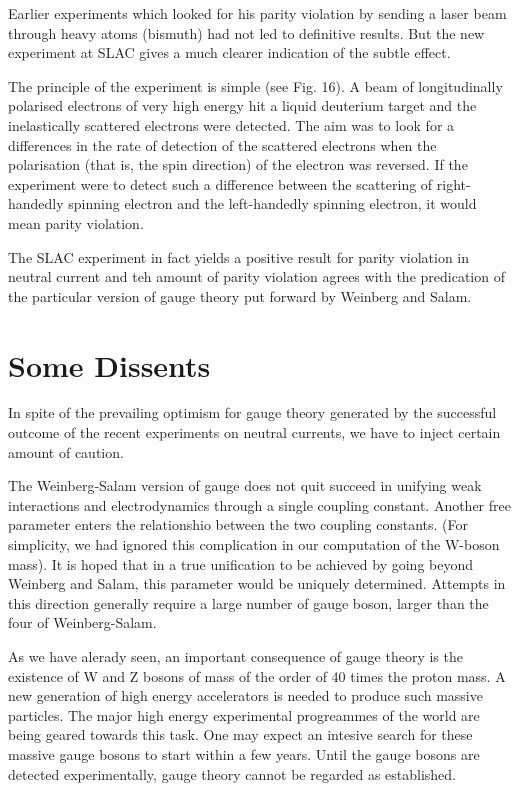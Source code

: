 Earlier experiments which looked for his parity violation by sending a laser beam through heavy atoms (bismuth) had not led to definitive results. But the new experiment at SLAC gives a much clearer indication of the subtle effect.

The principle of the experiment is simple (see Fig. 16). A beam of longitudinally polarised electrons of very high energy hit a liquid deuterium target and the inelastically scattered electrons were detected. The aim was to look for a differences in the rate of detection of the scattered electrons when the polarisation (that is, the spin direction) of the electron was reversed. If the experiment were to detect such a difference between the scattering of right-handedly spinning electron and the left-handedly spinning electron, it would mean parity violation.

The SLAC experiment in fact yields a positive result for parity violation in neutral current and teh amount of parity violation agrees with the predication of the particular version of gauge theory put forward by Weinberg and Salam.

\section*{Some Dissents}

In spite of the prevailing optimism for gauge theory generated by the successful outcome of the recent experiments on neutral currents, we have to inject certain amount of caution.

The Weinberg-Salam version of gauge does not quit succeed in unifying weak interactions and electrodynamics through a single coupling constant. Another free parameter enters the relationshio between the two coupling constants. (For simplicity, we had ignored this complication in our computation of the W-boson mass). It is hoped that in a true unification to be achieved by going beyond Weinberg and Salam, this parameter would be uniquely determined. Attempts in this direction generally require a large number of gauge boson, larger than the four of Weinberg-Salam.

As we have alerady seen, an important consequence of gauge theory is the existence of W and Z bosons of mass of the order of 40 times the proton mass. A new generation of high energy accelerators is needed to produce such massive particles. The major high energy experimental progreammes of the world are being geared towards this task. One may expect an intesive search for these massive gauge bosons to start within a few years. Until the gauge bosons are detected experimentally, gauge theory cannot be regarded as established.

